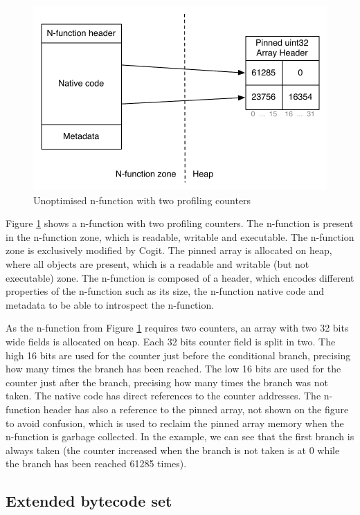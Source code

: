 \documentclass[a4paper,12pt,twoside]{../includes/ThesisStyle}
\begin{document}
\begin{figure}[h!]
    \begin{center}
        \includegraphics[width=0.8\linewidth]{ProfilingCounters}
        \caption{Unoptimised n-function with two profiling counters}
        \label{fig:ProfilingCounters}
    \end{center}
\end{figure}

Figure \ref{fig:ProfilingCounters} shows a n-function with two profiling counters. The n-function is present in the n-function zone, which is readable, writable and executable. The n-function zone is exclusively modified by Cogit. The pinned array is allocated on heap, where all objects are present, which is a readable and writable (but not executable) zone. The n-function is composed of a header, which encodes different properties of the n-function such as its size, the n-function native code and metadata to be able to introspect the n-function. 

As the n-function from Figure \ref{fig:ProfilingCounters} requires two counters, an array with two 32 bits wide fields is allocated on heap. Each 32 bits counter field is split in two. The high 16 bits are used for the counter just before the conditional branch, precising how many times the branch has been reached. The low 16 bits are used for the counter just after the branch, precising how many times the branch was not taken. The native code has direct references to the counter addresses. The n-function header has also a reference to the pinned array, not shown on the figure to avoid confusion, which is used to reclaim the pinned array memory when the n-function is garbage collected. In the example, we can see that the first branch is always taken (the counter increased when the branch is not taken is at 0 while the branch has been reached 61285 times).

\subsection{Extended bytecode set}
\end{document}
